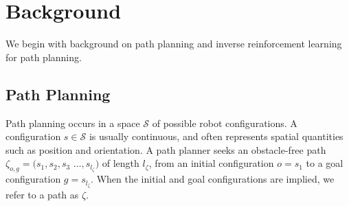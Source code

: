 \documentclass[letterpaper, 10 pt, conference]{ieeeconf}
\begin{document}



\section{Background}
We begin with background on path planning and inverse reinforcement learning for path planning.

\subsection{Path Planning \label{subsec:path_planning}}
Path planning occurs in a space $\mathcal{S}$ of possible robot configurations. A configuration $s \in \mathcal{S}$ is usually continuous, and often represents spatial quantities such as position and orientation. A path planner seeks an obstacle-free path $\zeta_{o,g} = (s_1,s_2,s_3$ $\ldots,s_{l_{\zeta}}) $ of length $l_{\zeta}$, from an initial configuration $o = s_1$ to a goal configuration  $g =s_{l_{\zeta}}$. When the initial and goal configurations are implied, we refer to a path as $\zeta$.
\end{document}
